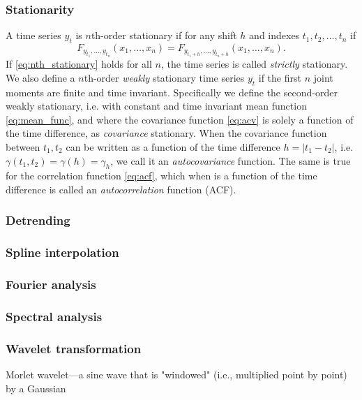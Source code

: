\documentclass{article}
\theoremstyle{plain}
\theoremstyle{definition}
\theoremstyle{remark}
\begin{document}
\subsubsection{Stationarity}
A time series $y_t$ is $n$th-order stationary if for any shift $h$ and indexes $t_1, t_2, \hdots, t_n$ if 
\begin{equation}\label{eq:nth_stationary}
        F_{y_{t_1}, \hdots, y_{t_n}}(x_1, \hdots, x_n) = F_{y_{t_{1}+h}, \hdots, y_{t_{n} +h}} (x_1, \hdots, x_n).
\end{equation}
If \eqref{eq:nth_stationary} holds for all $n$, the time series is called \textit{strictly} stationary.
We also define a $n$th-order \textit{weakly} stationary time series $y_t$ if the first $n$ joint moments are finite and time invariant.
Specifically we define the second-order weakly stationary, i.e. with constant and time invariant mean function \eqref{eq:mean_func}, and where the covariance function \eqref{eq:acv} is solely a function of the time difference, as \textit{covariance} stationary.
When the covariance function between $t_1, t_2$ can be written as a function of the time difference $h = |t_1 - t_2|$, i.e. $\gamma (t_1, t_2) = \gamma (h) = \gamma_h$, we call it an \textit{autocovariance} function. 
The same is true for the correlation function \eqref{eq:acf}, which when is a function of the time difference is called an \textit{autocorrelation} function (ACF).








\subsubsection{Detrending}
\subsubsection{Spline interpolation}
\subsubsection{Fourier analysis}
\subsubsection{Spectral analysis}
\subsubsection{Wavelet transformation}
Morlet wavelet—a sine wave that is "windowed" (i.e., multiplied point by point) by a Gaussian
\end{document}
